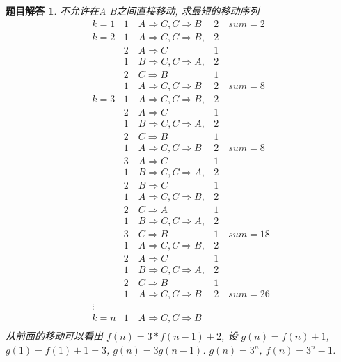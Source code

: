\documentclass[mode=geye]{elegantnote}
\newtheorem{answer}{题目解答}
\begin{document}
\begin{answer}
	不允许在A B之间直接移动, 求最短的移动序列
	\begin{equation*}
	\begin{array}{cll}
		k=1     & 1\quad A \Rightarrow C, C \Rightarrow B   & 2 \quad sum=2\\
		k=2     & 1\quad A \Rightarrow C, C \Rightarrow B,  & 2	\\
				& 2\quad A \Rightarrow C                 		& 1	\\
			 	& 1\quad B \Rightarrow C, C \Rightarrow A,  & 2	\\
			 	& 2\quad C \Rightarrow B						& 1	\\
			 	& 1\quad A \Rightarrow C, C \Rightarrow B   & 2 \quad sum=8 \\
		k=3     & 1\quad A \Rightarrow C, C \Rightarrow B,  & 2	\\
				& 2\quad A \Rightarrow C                 		& 1	\\
				& 1\quad B \Rightarrow C, C \Rightarrow A,  & 2	\\
				& 2\quad C \Rightarrow B						& 1	\\
				& 1\quad A \Rightarrow C, C \Rightarrow B   & 2 \quad sum=8\\
				& 3\quad A \Rightarrow C                 		& 1	\\
				& 1\quad B \Rightarrow C, C \Rightarrow A,  & 2	\\
				& 2\quad B \Rightarrow C						& 1	\\
				& 1\quad A \Rightarrow C, C \Rightarrow B,  & 2	\\
				& 2\quad C \Rightarrow A						& 1	\\
				& 1\quad B \Rightarrow C, C \Rightarrow A,  & 2	\\
				& 3\quad C \Rightarrow B						& 1	\quad sum=18\\
				& 1\quad A \Rightarrow C, C \Rightarrow B,  & 2	\\
				& 2\quad A \Rightarrow C                 		& 1	\\
				& 1\quad B \Rightarrow C, C \Rightarrow A,  & 2	\\
				& 2\quad C \Rightarrow B						& 1	\\
				& 1\quad A \Rightarrow C, C \Rightarrow B   & 2 \quad sum=26\\
		\vdots  &													& \\
		k=n     & 1\quad A \Rightarrow C, C \Rightarrow B	&  \\
	\end{array}
	\end{equation*}
	从前面的移动可以看出 $ f(n) = 3*f(n-1)+2 $, 设 $ g(n) = f(n)+1 $, $ g(1)=f(1)+1 = 3 $, $ g(n) = 3g(n-1) $. $ g(n) = 3^{n} $, $ f(n) = 3^{n}-1 $.
\end{answer}
\end{document}
